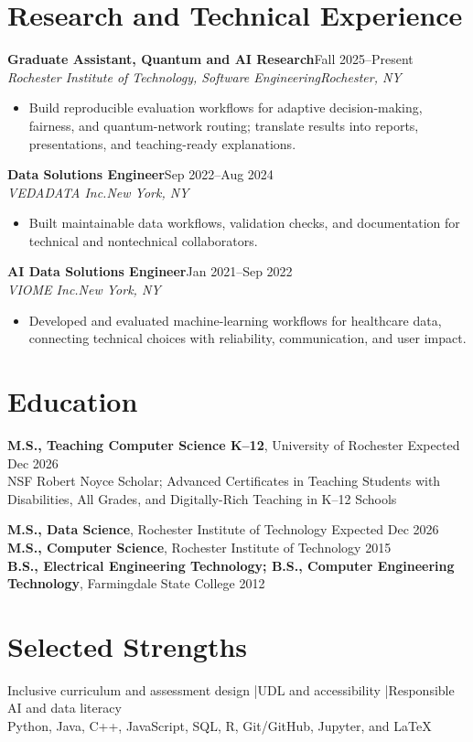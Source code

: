 \documentclass[10pt,letterpaper]{article}
\newcommand{\role}[4]{\textbf{#1}\hfill #2\\\textit{#3}\hfill\textit{#4}\vspace{-3pt}}
\begin{document}
\section*{Research and Technical Experience}
\role{Graduate Assistant, Quantum and AI Research}{Fall 2025--Present}
{Rochester Institute of Technology, Software Engineering}{Rochester, NY}
\begin{itemize}
  \item Build reproducible evaluation workflows for adaptive decision-making,
  fairness, and quantum-network routing; translate results into reports,
  presentations, and teaching-ready explanations.
\end{itemize}

\role{Data Solutions Engineer}{Sep 2022--Aug 2024}
{VEDADATA Inc.}{New York, NY}
\begin{itemize}
  \item Built maintainable data workflows, validation checks, and documentation
  for technical and nontechnical collaborators.
\end{itemize}

\role{AI Data Solutions Engineer}{Jan 2021--Sep 2022}
{VIOME Inc.}{New York, NY}
\begin{itemize}
  \item Developed and evaluated machine-learning workflows for healthcare data,
  connecting technical choices with reliability, communication, and user impact.
\end{itemize}

\section*{Education}
\textbf{M.S., Teaching Computer Science K--12}, University of Rochester
\hfill Expected Dec 2026\\
NSF Robert Noyce Scholar; Advanced Certificates in Teaching Students with
Disabilities, All Grades, and Digitally-Rich Teaching in K--12 Schools

\textbf{M.S., Data Science}, Rochester Institute of Technology
\hfill Expected Dec 2026\\
\textbf{M.S., Computer Science}, Rochester Institute of Technology \hfill 2015\\
\textbf{B.S., Electrical Engineering Technology; B.S., Computer Engineering Technology},
Farmingdale State College \hfill 2012

\section*{Selected Strengths}
Inclusive curriculum and assessment design \enspace|\enspace UDL and accessibility
\enspace|\enspace Responsible AI and data literacy\\
Python, Java, C++, JavaScript, SQL, R, Git/GitHub, Jupyter, and LaTeX
\end{document}
